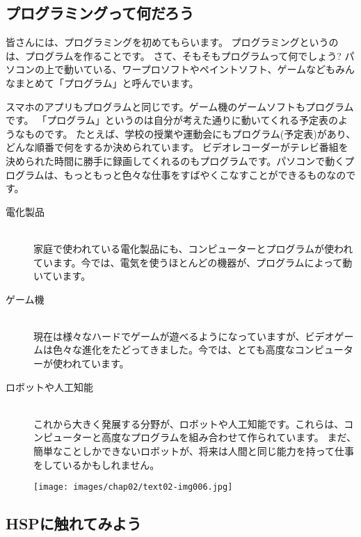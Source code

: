 % 
% 
% 
\subsection{プログラミングって何だろう}

皆さんには、プログラミングを初めてもらいます。
プログラミングというのは、プログラムを作ることです。
さて、そもそもプログラムって何でしょう?
パソコンの上で動いている、ワープロソフトやペイントソフト、ゲームなどもみんなまとめて「プログラム」と呼んでいます。

スマホのアプリもプログラムと同じです。ゲーム機のゲームソフトもプログラムです。
「プログラム」というのは自分が考えた通りに動いてくれる予定表のようなものです。
たとえば、学校の授業や運動会にもプログラム(予定表)があり、どんな順番で何をするか決められています。
ビデオレコーダーがテレビ番組を決められた時間に勝手に録画してくれるのもプログラムです。パソコンで動くプログラムは、もっともっと色々な仕事をすばやくこなすことができるものなのです。

\begin{description}
  \item[電化製品]\mbox{}\\
  家庭で使われている電化製品にも、コンピューターとプログラムが使われています。今では、電気を使うほとんどの機器が、プログラムによって動いています。
  \item[ゲーム機]\mbox{}\\
  現在は様々なハードでゲームが遊べるようになっていますが、ビデオゲームは色々な進化をたどってきました。今では、とても高度なコンピューターが使われています。
  \item[ロボットや人工知能]\mbox{}\\
  これから大きく発展する分野が、ロボットや人工知能です。これらは、コンピューターと高度なプログラムを組み合わせて作られています。
  まだ、簡単なことしかできないロボットが、将来は人間と同じ能力を持って仕事をしているかもしれません。
\end{description}

\begin{figure}[H]
  \begin{center}
    \texttt{[image: images/chap02/text02-img006.jpg]}
  \end{center}
  \label{fig:robot}
\end{figure}
\clearpage

% 
% 
% 
\subsection{HSPに触れてみよう}

